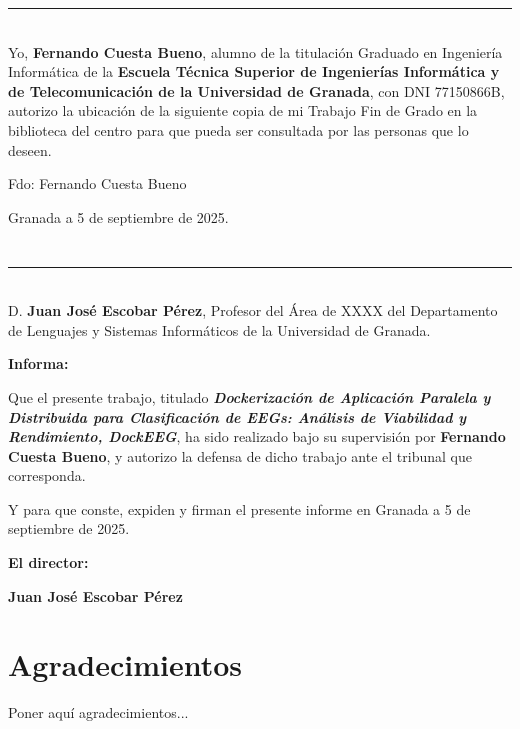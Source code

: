 \noindent\rule[-1ex]{\textwidth}{2pt}\\[4.5ex]

Yo, \textbf{Fernando Cuesta Bueno}, alumno de la titulación Graduado en Ingeniería Informática de la \textbf{Escuela Técnica Superior
       de Ingenierías Informática y de Telecomunicación de la Universidad de Granada}, con DNI 77150866B, autorizo la
ubicación de la siguiente copia de mi Trabajo Fin de Grado en la biblioteca del centro para que pueda ser
consultada por las personas que lo deseen.

\vspace{6cm}

\noindent Fdo: Fernando Cuesta Bueno

\vspace{2cm}

\begin{flushright}
       Granada a 5 de septiembre de 2025.
\end{flushright}


\chapter*{}
\thispagestyle{empty}

\noindent\rule[-1ex]{\textwidth}{2pt}\\[4.5ex]

D. \textbf{Juan José Escobar Pérez}, Profesor del Área de XXXX del Departamento de Lenguajes y Sistemas Informáticos de la Universidad de Granada.

\vspace{0.5cm}

\textbf{Informa:}

\vspace{0.5cm}

Que el presente trabajo, titulado \textit{\textbf{Dockerización de Aplicación Paralela y Distribuida para Clasificación de EEGs: Análisis de Viabilidad y Rendimiento, DockEEG}},
ha sido realizado bajo su supervisión por \textbf{Fernando Cuesta Bueno}, y autorizo la defensa de dicho trabajo ante el tribunal
que corresponda.

\vspace{0.5cm}

Y para que conste, expiden y firman el presente informe en Granada a 5 de septiembre de 2025.

\vspace{1cm}

\textbf{El director:}

\vspace{5cm}

\noindent \textbf{Juan José Escobar Pérez}

\chapter*{Agradecimientos}
\thispagestyle{empty}

\vspace{1cm}


Poner aquí agradecimientos...

